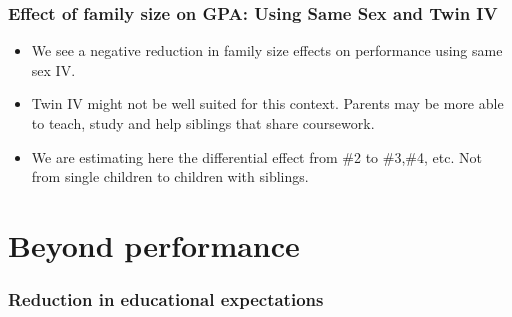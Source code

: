 \documentclass{beamer}
\begin{document}
\begin{frame}
    \label{frame:iv_conclusion}
    \frametitle{Effect of family size on GPA: Using Same Sex and Twin IV}
 \begin{itemize}
        \item We see a negative reduction in family size effects on performance using same sex IV.
        \item Twin IV might not be well suited for this context. Parents may be more able to teach, study and help siblings that share coursework. 
        \item We are estimating here the differential effect from \#2 to \#3,\#4, etc. Not from single children to children with siblings.
    \end{itemize}
\end{frame}

\section{Beyond performance}

    \begin{frame}
            \label{frame:expectations}
            \frametitle{Reduction in educational expectations}
      {
    }   %
    \end{frame}
\end{document}
